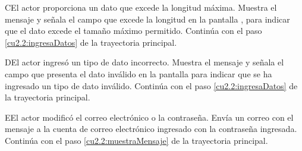  \begin{UCtrayectoriaA}{C}{El actor proporciona un dato que excede la longitud máxima.}
    \UCpaso[\UCsist] Muestra el mensaje  y señala el campo que excede la 
    longitud en la pantalla , para indicar que el dato excede el tamaño máximo permitido.
    \UCpaso[] Continúa con el paso \ref{cu2.2:ingresaDatos} de la trayectoria principal.
 \end{UCtrayectoriaA}
 
 \begin{UCtrayectoriaA}{D}{El actor ingresó un tipo de dato incorrecto.}
    \UCpaso[\UCsist] Muestra el mensaje  y señala el campo que presenta el dato inválido en la 
    pantalla  para indicar que se ha ingresado un tipo de dato inválido.
    \UCpaso[] Continúa con el paso \ref{cu2.2:ingresaDatos} de la trayectoria principal.
 \end{UCtrayectoriaA}
 \begin{UCtrayectoriaA}{E}{El actor modificó el correo electrónico o la contraseña.}
    \UCpaso[\UCsist] Envía un correo con el mensaje  a la cuenta de correo electrónico ingresado con la contraseña ingresada.
    \UCpaso[] Continúa con el paso \ref{cu2.2:muestraMensaje} de la trayectoria principal.
 \end{UCtrayectoriaA}
 